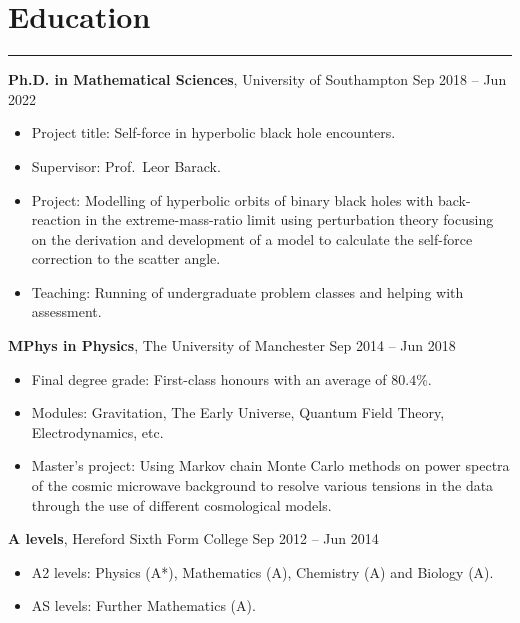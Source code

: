 \documentclass[10.5pt, oneside]{article}   	%
\begin{document}
{\color{Sectioncolour}
\section*{Education}
\vspace{-3mm}
\noindent\rule{\linewidth}{0.6pt}}

\textbf{Ph.D. in Mathematical Sciences}, University of Southampton \hfill Sep 2018 -- Jun 2022 \\
\vspace{-5mm}
\begin{itemize}
\item Project title: Self-force in hyperbolic black hole encounters.
\item Supervisor: Prof.\ Leor Barack.
\item Project: Modelling of hyperbolic orbits of binary black holes with back-reaction in the extreme-mass-ratio limit using perturbation theory focusing on the derivation and development of a model to calculate the self-force correction to the scatter angle.
\item Teaching: Running of undergraduate problem classes and helping with assessment.
\end{itemize}

\textbf{MPhys in Physics}, The University of Manchester \hfill Sep 2014 -- Jun 2018 \\
\vspace{-5mm}
\begin{itemize}
\item Final degree grade: First-class honours with an average of $80.4\%$.
\item Modules: Gravitation, The Early Universe, Quantum Field Theory,  Electrodynamics, etc.
\item Master's project: Using Markov chain Monte Carlo methods on power spectra of the cosmic microwave background to resolve various tensions in the data through the use of different cosmological models.
\end{itemize} 

\textbf{A levels}, Hereford Sixth Form College \hfill Sep 2012 -- Jun 2014 \\
\vspace{-5mm}
\begin{itemize}
\item A2 levels: Physics (A*), Mathematics (A), Chemistry (A) and Biology (A).
\item AS levels: Further Mathematics (A).
\end{itemize} 
\end{document}
